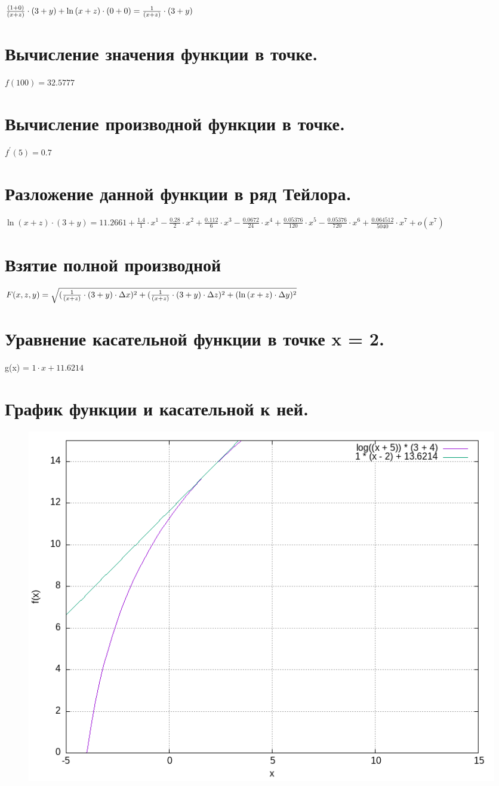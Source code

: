 \documentclass{article}
\begin{document}
${{{{({1} + {0})} \over {({x} + {z})}} \cdot {({3} + {y})}} + {{\ln{({x} + {z})}} \cdot {({0} + {0})}}} = {{{1} \over {({x} + {z})}} \cdot {({3} + {y})}}$
\section{Вычисление значения функции в точке.}

$ f(100) = 32.5777 $
\section{Вычисление производной функции в точке.}

$ f^{'}(5) = 0.7 $
\section{Разложение данной функции в ряд Тейлора.}

${{\ln{({x} + {z})}} \cdot {({3} + {y})}} =  11.2661 + \frac{1.4}{1}\cdot x^1 - \frac{0.28}{2}\cdot x^2 + \frac{0.112}{6}\cdot x^3 - \frac{0.0672}{24}\cdot x^4 + \frac{0.05376}{120}\cdot x^5 - \frac{0.05376}{720}\cdot x^6 + \frac{0.064512}{5040}\cdot x^7 + o(x^7) $
\section{Взятие полной производной}

$F(x, z, y) = \sqrt{({{{1} \over {({x} + {z})}} \cdot {({3} + {y})}} \cdot \Delta x)^2 + ({{{1} \over {({x} + {z})}} \cdot {({3} + {y})}} \cdot \Delta z)^2 + ({\ln{({x} + {z})}} \cdot \Delta y)^2} $

\section{Уравнение касательной функции в точке x = 2.}

g(x) = $1 \cdot  x + 11.6214 $
\section{График функции и касательной к ней.}


\begin{figure}[ht]
\center
\includegraphics[scale=0.65]{graph.png}
\end{figure}
\end{document}
